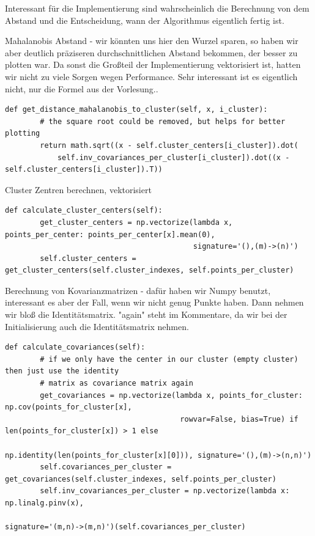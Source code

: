 Interessant für die Implementierung sind wahrscheinlich die Berechnung von dem Abstand und die Entscheidung,
wann der Algorithmus eigentlich fertig ist.


Mahalanobis Abstand - wir könnten uns hier den Wurzel sparen, so haben wir aber deutlich präziseren
durchschnittlichen Abstand bekommen, der besser zu plotten war. Da sonst die Großteil der Implementierung
vektorisiert ist, hatten wir nicht zu viele Sorgen wegen Performance. Sehr interessant ist es eigentlich nicht,
nur die Formel aus der Vorlesung..

\begin{lstlisting}[style=py]
    def get_distance_mahalanobis_to_cluster(self, x, i_cluster):
        # the square root could be removed, but helps for better plotting
        return math.sqrt((x - self.cluster_centers[i_cluster]).dot(
            self.inv_covariances_per_cluster[i_cluster]).dot((x - self.cluster_centers[i_cluster]).T))
\end{lstlisting}



Cluster Zentren berechnen, vektorisiert
\begin{lstlisting}[style=py]
    def calculate_cluster_centers(self):
        get_cluster_centers = np.vectorize(lambda x, points_per_center: points_per_center[x].mean(0),
                                           signature='(),(m)->(n)')
        self.cluster_centers = get_cluster_centers(self.cluster_indexes, self.points_per_cluster)
\end{lstlisting}


Berechnung von Kovarianzmatrizen - dafür haben wir Numpy benutzt, interessant es aber der Fall, wenn wir nicht genug
Punkte haben. Dann nehmen wir bloß die Identitätsmatrix. "again" steht im Kommentare, da wir bei der Initialisierung
auch die Identitätsmatrix nehmen.
\begin{lstlisting}[style=py]
    def calculate_covariances(self):
        # if we only have the center in our cluster (empty cluster) then just use the identity
        # matrix as covariance matrix again
        get_covariances = np.vectorize(lambda x, points_for_cluster: np.cov(points_for_cluster[x],
                                        rowvar=False, bias=True) if len(points_for_cluster[x]) > 1 else
                                        np.identity(len(points_for_cluster[x][0])), signature='(),(m)->(n,n)')
        self.covariances_per_cluster = get_covariances(self.cluster_indexes, self.points_per_cluster)
        self.inv_covariances_per_cluster = np.vectorize(lambda x: np.linalg.pinv(x),
                                                        signature='(m,n)->(m,n)')(self.covariances_per_cluster)
\end{lstlisting}


